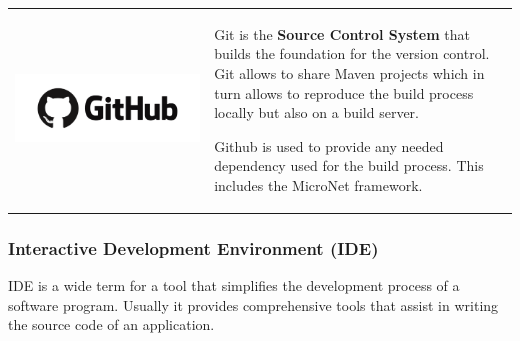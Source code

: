 \begin{table}[h!]
  \centering
  \begin{tabular}{ c m{9cm} }
    \begin{minipage}{.3\textwidth}
      \includegraphics[width=\linewidth]{images/dependencies/github}
    \end{minipage}&
	Git is the \textbf{Source Control System} that builds the foundation for the
	version control. Git allows to share Maven projects which in turn allows to
	reproduce the build process locally but also on a build server. 
	
	Github is used to provide any needed dependency used for the build process.
	This includes the MicroNet framework.
  \end{tabular}
\end{table}
\FloatBarrier
\newpage

\subsubsection{Interactive Development Environment (IDE)}

IDE is a wide term for a tool that simplifies the development process of a
software program. Usually it provides comprehensive tools that assist in writing
the source code of an application.

